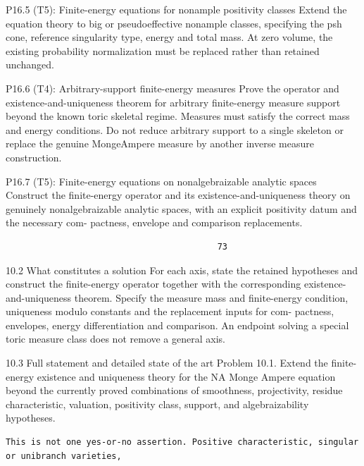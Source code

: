 \documentclass[
  10pt,
]{article}
\begin{document}
P16.5 (T5): Finite-energy equations for nonample positivity classes
Extend the equation theory to big or pseudoeffective nonample classes,
specifying the psh cone, reference singularity type, energy and total
mass. At zero volume, the existing probability normalization must be
replaced rather than retained unchanged.

P16.6 (T4): Arbitrary-support finite-energy measures Prove the operator
and existence-and-uniqueness theorem for arbitrary finite-energy measure
support beyond the known toric skeletal regime. Measures must satisfy
the correct mass and energy conditions. Do not reduce arbitrary support
to a single skeleton or replace the genuine MongeAmpere measure by
another inverse measure construction.

P16.7 (T5): Finite-energy equations on nonalgebraizable analytic spaces
Construct the finite-energy operator and its existence-and-uniqueness
theory on genuinely nonalgebraizable analytic spaces, with an explicit
positivity datum and the necessary com- pactness, envelope and
comparison replacements.

\begin{verbatim}
                                          73
\end{verbatim}

10.2 What constitutes a solution For each axis, state the retained
hypotheses and construct the finite-energy operator together with the
corresponding existence-and-uniqueness theorem. Specify the measure mass
and finite-energy condition, uniqueness modulo constants and the
replacement inputs for com- pactness, envelopes, energy differentiation
and comparison. An endpoint solving a special toric measure class does
not remove a general axis.

10.3 Full statement and detailed state of the art Problem 10.1. Extend
the finite-energy existence and uniqueness theory for the NA Monge
Ampere equation beyond the currently proved combinations of smoothness,
projectivity, residue characteristic, valuation, positivity class,
support, and algebraizability hypotheses.

\begin{verbatim}
This is not one yes-or-no assertion. Positive characteristic, singular or unibranch varieties,
\end{verbatim}
\end{document}
